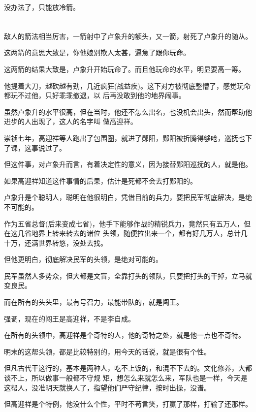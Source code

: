 \documentclass[11pt,a4paper,onecolumn]{article}
\begin{document}
没办法了，只能放冷箭。

\section[\thesection]{}

敌人的箭法相当厉害，一箭射中了卢象升的额头，又一箭，射死了卢象升的随从。

这两箭的意思大致是，你他娘别欺人太甚，逼急了跟你玩命。

这两箭的结果大致是，卢象升开始玩命了。而且他玩命的水平，明显要高一筹。

他提着大刀，越砍越有劲，几近疯狂(战益疾)。这下对方被彻底整懵了，感觉玩命都玩不过他，只好乖乖撤退，以
后再没敢到他的地界闹事。

虽然卢象升的水平很高，但在当时，他还不怎么出名，也没机会出头，然而帮助他进步的人出现了，这人的名字叫
做高迎祥。

崇祯七年，高迎祥等人跑出了包围圈，就进了郧阳，郧阳被折腾得够呛，巡抚也下了课，这事说过了。

但这件事，对卢象升而言，有着决定性的意义，因为接替郧阳巡抚的人，就是他。

如果高迎祥知道这件事情的后果，估计是死都不会去打郧阳的。

卢象升是个聪明人，聪明在他很明白，凭借目前的兵力，要把民军彻底解决，是绝不可能的。

作为五省总督(后来变成七省)，他手下能够作战的精锐兵力，竟然只有五万人，但在这几省地界上转来转去的诸位
头领，随便拉出来一个，都有好几万人，总计几十万，还满世界转悠，没处去找。

但他更明白，彻底解决民军的头领，是绝对可能的。

民军虽然人多势众，但大都是文盲，全靠打头的领队，只要把打头的干掉，立马就变良民。

而在所有的头头里，最有号召力，最能带队的，就是闯王。

强调，现在的闯王是高迎祥，不是李自成。

在所有的头领中，高迎祥是个奇特的人，他的奇特之处，就是他一点也不奇特。

明末的这帮头领，都是比较特别的，用今天的话说，就是很有个性。

但凡古代干这行的，基本是两种人，吃不上饭的，和混不下去的。文化修养，大都谈不上，所以做事一般都不守规
矩，想怎么来就怎么来，军队也是一样，今天是这帮人，没准明天就换人了，指望他们严守纪律，按时出操，没谱。

但高迎祥是个特例，他没什么个性，平时不苟言笑，打赢了那样，打输了还那样。

\section[\thesection]{}
\end{document}
